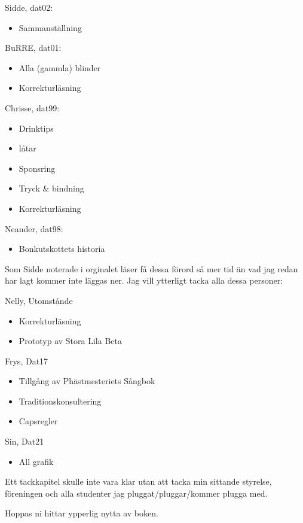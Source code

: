 Sidde, dat02:
\begin{itemize}
  \item Sammanställning
\end{itemize}
BuRRE, dat01:
\begin{itemize}
  \item Alla (gammla) blinder
  \item Korrekturläsning
\end{itemize}
Chrisse, dat99:
\begin{itemize}
  \item Drinktips
  \item låtar
  \item Sponsring
  \item Tryck \& bindning
  \item Korrekturläsning
\end{itemize}
Neander, dat98:
\begin{itemize}
  \item Bonkutskottets historia
\end{itemize}

Som Sidde noterade i orginalet läser få dessa förord så mer tid än vad jag redan
har lagt kommer inte läggas ner. Jag vill ytterligt tacka alla dessa personer:

Nelly, Utomstånde
\begin{itemize}
  \item Korrekturläsning
  \item Prototyp av Stora Lila Beta
\end{itemize}
Frys, Dat17
\begin{itemize}
  \item Tillgång av Phästmesteriets Sångbok
  \item Traditionskonsultering
  \item Capsregler
\end{itemize}
Sin, Dat21
\begin{itemize}
  \item All grafik
\end{itemize}

Ett tackkapitel skulle inte vara klar utan att tacka min sittande styrelse, föreningen och alla studenter jag pluggat/pluggar/kommer plugga med.

Hoppas ni hittar ypperlig nytta av boken.

\newpage



